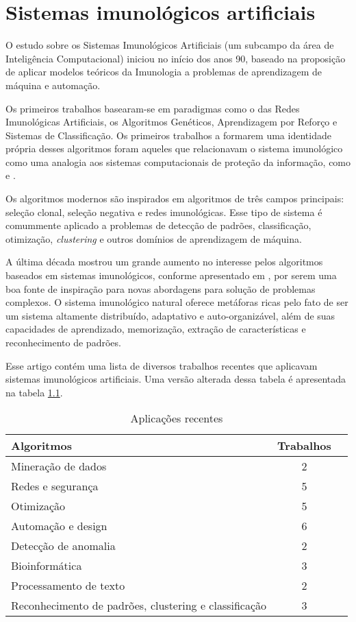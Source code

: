 \chapter{Sistemas imunológicos artificiais}

O estudo sobre os Sistemas Imunológicos Artificiais (um subcampo da área de Inteligência Computacional) iniciou no início dos anos 90, baseado na proposição de aplicar modelos teóricos da Imunologia a problemas de aprendizagem de máquina e automação.

Os primeiros trabalhos basearam-se em paradigmas como o das Redes Imunológicas Artificiais, os Algoritmos Genéticos, Aprendizagem por Reforço e Sistemas de Classificação. Os primeiros trabalhos a formarem uma identidade própria desses algoritmos foram aqueles que relacionavam o sistema imunológico como uma analogia aos sistemas computacionais de proteção da informação, como \citet{Forrest1994} e \citet{Forrest1997}.

Os algoritmos modernos são inspirados em algoritmos de três campos principais: seleção clonal, seleção negativa e redes imunológicas. Esse tipo de sistema é comummente aplicado a problemas de detecção de padrões, classificação, otimização, \emph{clustering} e outros domínios de aprendizagem de máquina.

A última década mostrou um grande aumento no interesse pelos algoritmos baseados em sistemas imunológicos, conforme apresentado em \citet{Dasgupta2010}, por serem uma boa fonte de inspiração para novas abordagens para solução de problemas complexos. O sistema imunológico natural oferece metáforas ricas pelo fato de ser um sistema altamente distribuído, adaptativo e auto-organizável, além de suas capacidades de aprendizado, memorização, extração de características e reconhecimento de padrões.

Esse artigo contém uma lista de diversos trabalhos recentes que aplicavam sistemas imunológicos artificiais. Uma versão alterada dessa tabela é apresentada na tabela \ref{ais:recent}.

\begin{table}[h]
    \centering
    \begin{tabular}{l c r}
        \hline
        Algoritmos & Trabalhos     \\
        \hline
        Mineração de dados     & 2 \\
        Redes e segurança      & 5 \\
        Otimização             & 5 \\
        Automação e design     & 6 \\
        Detecção de anomalia   & 2 \\
        Bioinformática         & 3 \\
        Processamento de texto & 2\\
        Reconhecimento de padrões, clustering e classificação & 3 \\
        \hline
    \end{tabular}
    \caption{Aplicações recentes}
    \label{ais:recent}
\end{table}


